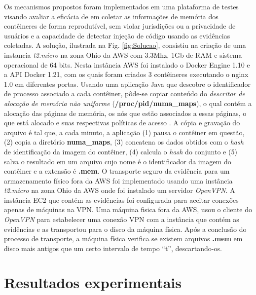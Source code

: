 %
Os mecanismos propostos foram implementados em uma plataforma de testes visando avaliar a eficácia de \fancyname em coletar as informações de memória dos contêineres de forma reprodutível, sem violar jurisdições ou a privacidade de usuários e a capacidade de detectar injeção de código usando as evidências coletadas.
%
A solução, ilustrada na Fig. \ref{fig:Solucao}, consistiu na criação de uma instancia \textit{t2.micro} na zona Ohio da AWS com 3.3Mhz, 1Gb de RAM e sistema operacional de 64 bits. 
%
Nesta instância AWS foi instalado o Docker Engine 1.10 e a API Docker 1.21, com os quais foram criados 3 contêineres executando o nginx 1.0 em diferentes portas. 
%
Usando uma aplicação Java que descobre o identificador de processo associado a cada contêiner, pôde-se copiar conteúdo do \textit{descritor de alocação de memória não uniforme} (\textbf{/proc/pid/numa\_maps}), o qual contém a alocação das páginas de memória, os nós que estão associados a essas páginas, o que está alocado e suas respectivas políticas de acesso \cite{UnixManPagesNumaMaps}.
%
A cópia e gravação do arquivo é tal que, a cada minuto, a aplicação (1) pausa o contêiner em questão, (2) copia a diretório \textbf{numa\_maps}, (3)  concatena os dados obtidos com o \textit{hash} de identificação da imagem do contêiner, (4) calcula o \textit{hash} do conjunto e (5) salva o resultado em um arquivo cujo nome é o identificador da imagem do contêiner e a extensão é \textbf{.mem}. 
%
O transporte seguro da evidência para um armazenamento físico fora da AWS foi implementado usando uma instância \textit{t2.micro} na zona Ohio da AWS onde foi instalado um servidor \textit{OpenVPN}.
%
A instância EC2 que contém as evidências foi configurada para aceitar conexões apenas de máquinas na VPN.
%
Uma máquina fisica fora da AWS, usou o cliente do \textit{OpenVPN} para estabelecer uma conexão VPN com a instância que contém as evidências e as transportou para o disco da máquina física.
%
Após a conclusão do processo de transporte, a máquina física verifica se existem arquivos \textbf{.mem} em disco mais antigos que um certo intervalo de tempo ``t'', descartando-os.
%


\section{Resultados experimentais}
\label{sec:proposta-exp}

